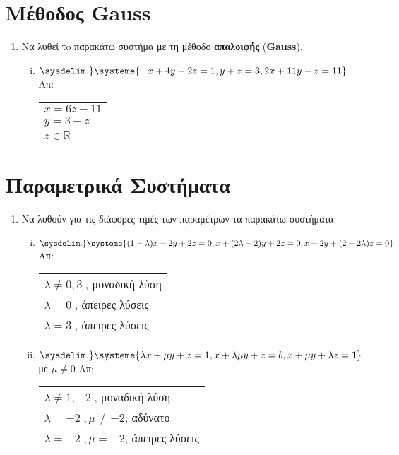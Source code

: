 \documentclass[a4paper,table]{report}
\begin{document}
\section*{Μέθοδος Gauss}


\begin{enumerate}
  \setlength{\itemsep}{\baselineskip}
  \item Να λυθεί τo παρακάτω συστήμα με τη μέθοδο \textbf{απαλοιφής} (\textbf{Gauss}).

    \begin{enumerate}[i)]
      \setlength{\itemsep}{\baselineskip}
    \item $\sysdelim.\} \systeme{\phantom{-}x+4y-2z=1, y+z=3, 2x+11y-z= 11}$ 
      \hfill Απ: \begin{tabular}{l}
        $ x=6z-11 $ \\
        $ y=3-z $ \\
        $z \in \mathbb{R}$
      \end{tabular}
  \end{enumerate}
\end{enumerate}


\section*{Παραμετρικά Συστήματα}


\begin{enumerate}


  \item Να λυθούν για τις διάφορες τιμές των παραμέτρων τα παρακάτω συστήματα.


    \begin{enumerate}[i)]
    \setlength{\itemsep}{\baselineskip}
    \item $\sysdelim.\} \systeme{{(1-\lambda)} x - 2y + 2z = 0, x + {(2 \lambda-2)} y + 2z = 0, x - 2y + {(2-2 \lambda)} z = 0 }$ 
      \hfill Απ: \begin{tabular}{l}
        $\lambda\neq 0, 3 \; $, μοναδική λύση \\
        $\lambda=0 \; $, άπειρες λύσεις \\
        $\lambda=3 \; $, άπειρες λύσεις
      \end{tabular}

    \item $\sysdelim.\} \systeme{ \lambda x+ \mu y+z=1,x+{\lambda \mu }y+z=b,x+ \mu y+
      \lambda z=1}$ με $ \mu \neq 0 $ 
      \hfill Απ: \begin{tabular}{l} 
        $ \lambda \neq 1, -2 \; $, μοναδική λύση \\
        $ \lambda =-2 \;, \mu \neq -2 $, αδύνατο \\
        $ \lambda =-2 \;, \mu = -2 $, άπειρες λύσεις
      \end{tabular}
  \end{enumerate}
\end{enumerate}
\end{document}
